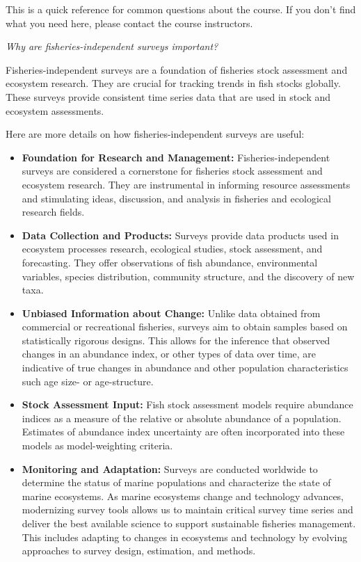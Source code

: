 \documentclass[
  letterpaper,
  oneside,
  open=any]{scrbook}
\providecommand{\tightlist}{%
  \setlength{\itemsep}{0pt}\setlength{\parskip}{0pt}}\usepackage{longtable,booktabs,array}
\begin{document}
This is a quick reference for common questions about the course. If you
don't find what you need here, please contact the course instructors.

\emph{Why are fisheries-independent surveys important?}

Fisheries-independent surveys are a foundation of fisheries stock
assessment and ecosystem research. They are crucial for tracking trends
in fish stocks globally. These surveys provide consistent time series
data that are used in stock and ecosystem assessments.

Here are more details on how fisheries-independent surveys are useful:

\begin{itemize}
\tightlist
\item
  \textbf{Foundation for Research and Management:} Fisheries-independent
  surveys are considered a cornerstone for fisheries stock assessment
  and ecosystem research. They are instrumental in informing resource
  assessments and stimulating ideas, discussion, and analysis in
  fisheries and ecological research fields.
\item
  \textbf{Data Collection and Products:} Surveys provide data products
  used in ecosystem processes research, ecological studies, stock
  assessment, and forecasting. They offer observations of fish
  abundance, environmental variables, species distribution, community
  structure, and the discovery of new taxa.
\item
  \textbf{Unbiased Information about Change:} Unlike data obtained from
  commercial or recreational fisheries, surveys aim to obtain samples
  based on statistically rigorous designs. This allows for the inference
  that observed changes in an abundance index, or other types of data
  over time, are indicative of true changes in abundance and other
  population characteristics such age size- or age-structure.
\item
  \textbf{Stock Assessment Input:} Fish stock assessment models require
  abundance indices as a measure of the relative or absolute abundance
  of a population. Estimates of abundance index uncertainty are often
  incorporated into these models as model-weighting criteria.
\item
  \textbf{Monitoring and Adaptation:} Surveys are conducted worldwide to
  determine the status of marine populations and characterize the state
  of marine ecosystems. As marine ecosystems change and technology
  advances, modernizing survey tools allows us to maintain critical
  survey time series and deliver the best available science to support
  sustainable fisheries management. This includes adapting to changes in
  ecosystems and technology by evolving approaches to survey design,
  estimation, and methods.
\end{itemize}
\end{document}
